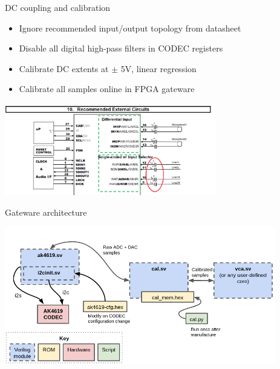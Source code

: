 \documentclass{beamer}
\begin{document}
\begin{frame}{DC coupling and calibration}


    \begin{itemize}
        \item Ignore recommended input/output topology from datasheet
        \item Disable all digital high-pass filters in CODEC registers
        \item Calibrate DC extents at $\pm$ 5V, linear regression
        \item Calibrate all samples online in FPGA gateware
    \end{itemize}

    \begin{center}
        \includegraphics[height=4cm]{img/datasheet_ac_coupling.png}
    \end{center}

\end{frame}

\begin{frame}{Gateware architecture}

    \begin{center}
        \includegraphics[height=6cm]{img/gateware-arch.png}
    \end{center}

\end{frame}
\end{document}
